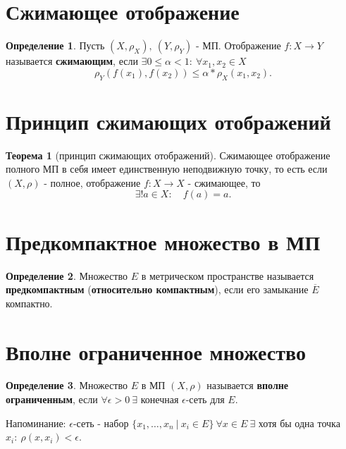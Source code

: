 \documentclass{report}
\theoremstyle{definition}
\newtheorem*{definition}{Определение}
\newtheorem*{theorem}{Теорема}
\begin{document}
\section{Сжимающее отображение}

\begin{definition}
    Пусть $(X,\rho_X), \ (Y,\rho_Y)$ - МП. Отображение $f:X\rightarrow Y$ называется \textbf{сжимающим},
    если $\exists 0 \leqslant \alpha < 1: \ \forall x_1,x_2 \in X$
    \begin{equation*}
        \rho_Y(f(x_1),f(x_2)) \leqslant \alpha * \rho_X(x_1,x_2).
    \end{equation*}
\end{definition}

\section{Принцип сжимающих отображений}

\begin{theorem}[принцип сжимающих отображений]
    Сжимающее отображение полного МП в себя имеет единственную неподвижную точку, то есть если
    $(X,\rho)$ - полное, отображение $f:X\rightarrow X$ - сжимающее, то
    \begin{equation*}
        \exists ! a \in X: \quad f(a) = a.
    \end{equation*}
\end{theorem}

\section{Предкомпактное множество в МП}

\begin{definition}
    Множество $E$ в метрическом пространстве называется \textbf{предкомпактным} (\textbf{относительно компактным}),
    если его замыкание $\overline{E}$ компактно.
\end{definition}

\section{Вполне ограниченное множество}

\begin{definition}
    Множество $E$ в МП $(X,\rho)$ называется \textbf{вполне ограниченным}, если $\forall \epsilon > 0 \ \exists$
    конечная $\epsilon$-сеть для $E$.

    Напоминание: $\epsilon$-сеть - набор $\{x_1,\ldots,x_n \ | \ x_i \in E\} \ \forall x \in E \ \exists$ хотя бы
    одна точка $x_i: \ \rho(x,x_i) < \epsilon$.
\end{definition}
\end{document}
